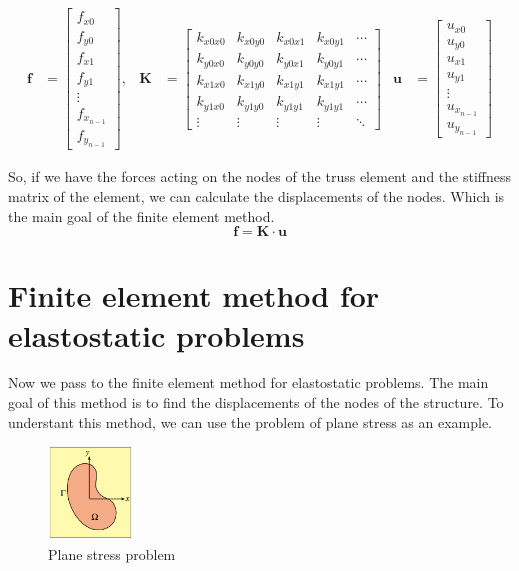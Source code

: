 \documentclass{article}  %
\begin{document}
\begin{align}
    \mathbf{f} &=
    \begin{bmatrix}
        f_{x0} \\
        f_{y0} \\
        f_{x1} \\
        f_{y1} \\
        \vdots \\
        f_{x_{n-1}} \\
        f_{y_{n-1}}
    \end{bmatrix},
    &
    \mathbf{K} &=
    \begin{bmatrix}
        k_{x0x0} & k_{x0y0} & k_{x0x1} &  k_{x0y1} & \cdots \\
        k_{y0x0} & k_{y0y0} &  k_{y0x1} & k_{y0y1} & \cdots \\
        k_{x1x0} & k_{x1y0} & k_{x1y1} &k_{x1y1} & \cdots \\
        k_{y1x0} & k_{y1y0} & k_{y1y1} &k_{y1y1} & \cdots \\
        \vdots & \vdots & \vdots & \vdots & \ddots
    \end{bmatrix}
    &
    \mathbf{u} &=
    \begin{bmatrix}
        u_{x0} \\
        u_{y0} \\
        u_{x1} \\
        u_{y1} \\
        \vdots \\
        u_{x_{n-1}} \\
        u_{y_{n-1}}
    \end{bmatrix}
\end{align}

So, if we have the forces acting on the nodes of the truss element and the stiffness matrix of the element, we can calculate the displacements of the nodes. Which is the main goal of the finite element method. \\

\begin{equation}
    \mathbf{f} = \mathbf{K} \cdot \mathbf{u}
\end{equation}


\newpage
\section{Finite element method for elastostatic problems}
Now we pass to the finite element method for elastostatic problems. The main goal of this method is to find the displacements of the nodes of the structure. To understant this method, we can use the problem of plane stress as an example.
\begin{figure}[h]
    \centering
    \includegraphics[width=0.2\textwidth]{Graphics/plane_stress.png}
    \caption{Plane stress problem}
    \label{fig:plane_stress}
\end{figure}
\end{document}
